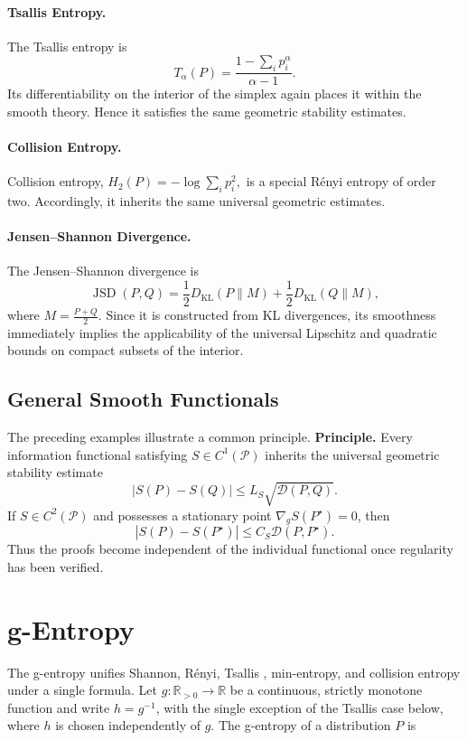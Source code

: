 \paragraph{Tsallis Entropy.}
The Tsallis entropy is
\[ T_\alpha(P) = \frac{1-\sum_i p_i^{\alpha}}{\alpha-1}.
\]
Its differentiability on the interior of the simplex again places it
within the smooth theory.
Hence it satisfies the same geometric stability estimates.
\paragraph{Collision Entropy.}
Collision entropy,
$H_2(P) = -\log \sum_i p_i^{2},$
is a special R\'enyi entropy of order two.
Accordingly, it inherits the same universal geometric estimates.
\paragraph{Jensen--Shannon Divergence.}
The Jensen--Shannon divergence is
\[ \operatorname{JSD}(P,Q) = \frac12
D_{\mathrm{KL}}(P\|M) + \frac12
D_{\mathrm{KL}}(Q\|M), \]
where
$M=\frac{P+Q}{2}.$
Since it is constructed from KL divergences, its smoothness immediately
implies the applicability of the universal Lipschitz and quadratic
bounds on compact subsets of the interior.
\subsection{General Smooth Functionals}\label{ch:sec:general-smooth-functionals}
The preceding examples illustrate a common principle.
\textbf{Principle.}  Every information functional satisfying
\(S\in C^{1}(\mathcal P)\) inherits the universal geometric stability
estimate
\[
|S(P)-S(Q)| \le L_S \sqrt{\mathcal D(P,Q)}.
\]
If \(S\in C^{2}(\mathcal P)\) and possesses a stationary point
\(\nabla_g S(P^{\star})=0\), then
\[
|S(P)-S(P^{\star})| \le C_S \mathcal D(P,P^{\star}).
\]
Thus the proofs become independent of the individual functional once
regularity has been verified.

\section{g-Entropy}\label{ch:sec:g-entropy}

The g-entropy \cite{briet2019properties} unifies Shannon, R\'enyi,
Tsallis \cite{tsallis1988possible}, min-entropy, and collision entropy under a single formula.
Let \(g:\mathbb R_{>0}\to\mathbb R\) be a continuous, strictly
monotone function and write \(h=g^{-1}\), with the single exception of the
Tsallis case below, where \(h\) is chosen independently of \(g\).
The g-entropy of a distribution \(P\) is


